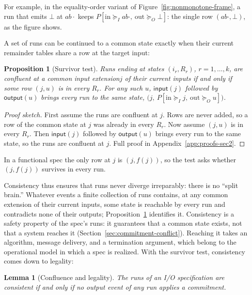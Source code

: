 \documentclass[sigconf]{cidr-2027}
\newtheorem{proposition}{Proposition}
\newtheorem{lemma}{Lemma}
\theoremstyle{remark}
\newcommand{\InputGe}{\succeq_I}
\newcommand{\OutputGe}{\succeq_O}
\newcommand{\commitment}{commitment\xspace}
\newcommand{\indesc}{input extension\xspace} %
\newcommand{\spectype}[1][]{I/O specification#1\xspace}
\begin{document}
For example, in the equality-order variant of
Figure~\ref{fig:nonmonotone-frame}, a run that emits $\bot$ at $ab\cdot$ keeps
$P[\mathrm{in}\InputGe ab\cdot,\ \mathrm{out}\OutputGe\bot]$: the single row
$(ab\cdot,\bot)$, as the figure shows.

\textcolor{reviewed}{A set of runs can be continued to a common state exactly when their
current remainder tables share a row at the target input:}

\begin{proposition}[Survivor test]
\label{prop:confluence}
\textcolor{reviewed}{Runs ending at states $(i_r,R_r)$, $r=1,\ldots,k$, are confluent at a common
\indesc $j$ of their current inputs if and only if some row $(j,u)$ is in every
$R_r$.} \textcolor{reviewed}{For any such $u$, $\mathsf{input}(j)$ followed by $\mathsf{output}(u)$
brings every run to the same state,
$\bigl(j,\ P[\mathrm{in}\InputGe j,\ \mathrm{out}\OutputGe u]\bigr)$.}
\end{proposition}

\begin{proof}[Proof sketch]
\textcolor{reviewed}{First assume the runs are confluent at $j$.} \textcolor{reviewed}{Rows are never added, so a row of
the common state at $j$ was already in every $R_r$.} \textcolor{reviewed}{Now assume $(j,u)$ is in
every $R_r$.} \textcolor{reviewed}{Then $\mathsf{input}(j)$ followed by $\mathsf{output}(u)$ brings
every run to the same state, so the runs are confluent at $j$.} Full proof in
Appendix~\ref{app:proofs-sec2}.
\end{proof}

In a functional spec the only row at $j$ is $(j,f(j))$, so the test
asks whether $(j,f(j))$ survives in every run.

Consistency thus ensures that runs never diverge irreparably: there is no
``split brain.''  Whatever events a finite collection of runs contains, at any common extension of their current inputs, some state is reachable by every run
and contradicts none of their outputs; Proposition~\ref{prop:confluence}
identifies it. Consistency is a safety property of the spec's runs: it guarantees that a common
state exists, not that a system reaches it
(Section~\ref{sec:commitment-conflict}). Reaching it takes an algorithm,
message delivery, and a termination argument, which belong to the operational
model in which a spec is realized. \textcolor{reviewed}{With the survivor test, consistency comes down to legality:}

\begin{lemma}[Confluence and legality]
\label{lem:confluence-legality}
\textcolor{reviewed}{The runs of an \spectype are consistent if and only if no output event of any
run applies a \commitment.}
\end{lemma}
\end{document}
